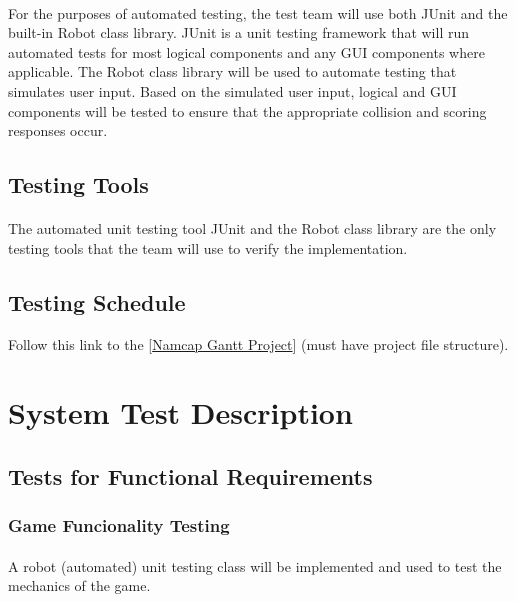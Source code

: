 \documentclass[12pt, titlepage]{article}
\begin{document}
\paragraph{}
For the purposes of automated testing, the test team will use both JUnit and the built-in Robot class library. JUnit is a unit testing framework that will run automated tests for most logical components and any GUI components where applicable. The Robot class library will be used to automate testing that simulates user input. Based on the simulated user input, logical and GUI components will be tested to ensure that the appropriate collision and scoring responses occur.

\subsection{Testing Tools}
\paragraph{}
The automated unit testing tool JUnit and the Robot class library are the only testing tools that the team will use to verify the implementation.

\subsection{Testing Schedule}
		
Follow this link to the [\href{run:../DevelopmentPlan/NamcapGanttProject.gan}{Namcap Gantt Project}] (must have project file structure).

\section{System Test Description}
	
\subsection{Tests for Functional Requirements}

\subsubsection{Game Funcionality Testing}
		
\paragraph{}
A robot (automated) unit testing class will be implemented and used to test the mechanics of the game.
\end{document}
